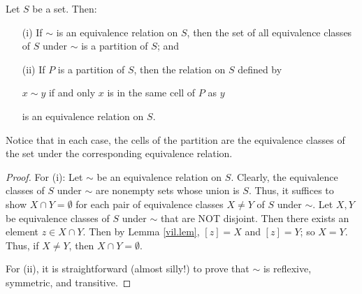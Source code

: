 \begin{center}\end{center}

\begin{thm}\label{part.quiv} Let $S$ be a set.  Then:

\begin{enumerate}
\item[(i)] If $\sim$ is an equivalence relation on $S$,
    then the set of all equivalence classes of $S$ under
    $\sim$ is a partition of $S$; and
\item[(ii)] If $P$ is a partition of $S$, then the relation on $S$
defined by
\begin{center}$x\sim y$ if and only $x$ is in the same
cell of $P$ as $y$ \end{center} is an equivalence relation on $S$.
\end{enumerate}
Notice that in each case, the cells of the partition are the
equivalence classes of the set under the corresponding equivalence
relation.
\end{thm}

\begin{proof} For (i): Let $\sim$ be an equivalence relation on $S$.
Clearly, the equivalence classes of $S$ under $\sim$ are
nonempty sets whose union is $S$. Thus, it suffices to show $X
\cap Y =\emptyset$ for each pair of equivalence classes $X\neq
Y$ of $S$ under $\sim$.  Let $X,Y$ be equivalence classes of
$S$ under $\sim$ that are NOT disjoint.  Then there exists an
element $z\in X\cap Y$. Then by Lemma \ref{vil.lem}, $[z]=X$
and $[z]=Y$; so $X=Y$. Thus, if $X\neq Y$, then $X\cap Y
=\emptyset$.

For (ii), it is straightforward (almost silly!) to prove that
$\sim$ is reflexive, symmetric, and transitive.\end{proof}

